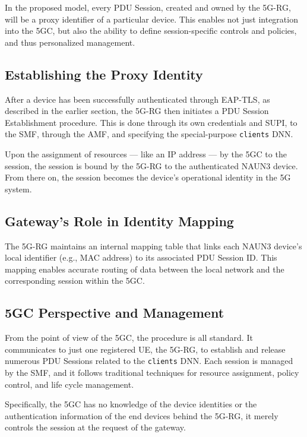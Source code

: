 In the proposed model, every \ac{PDU} Session, created and owned by the \ac{5G-RG}, will be a proxy identifier of a particular device. This enables not just integration into the \ac{5GC}, but also the ability to define session-specific controls and policies, and thus personalized management.

\subsection{Establishing the Proxy Identity}

After a device has been successfully authenticated through \ac{EAP-TLS}, as described in the earlier section, the \ac{5G-RG} then initiates a \ac{PDU} Session Establishment procedure. This is done through its own credentials and \ac{SUPI}, to the \ac{SMF}, through the \ac{AMF}, and specifying the special-purpose \texttt{clients} \ac{DNN}.

Upon the assignment of resources — like an IP address — by the \ac{5GC} to the session, the session is bound by the \ac{5G-RG} to the authenticated \ac{NAUN3} device. From there on, the session becomes the device’s operational identity in the \ac{5G} system.

\subsection{Gateway’s Role in Identity Mapping}

The \ac{5G-RG} maintains an internal mapping table that links each \ac{NAUN3} device’s local identifier (e.g., \ac{MAC} address) to its associated \ac{PDU} Session ID. This mapping enables accurate routing of data between the local network and the corresponding session within the \ac{5GC}.

\subsection{\ac{5GC} Perspective and Management}

From the point of view of the \ac{5GC}, the procedure is all standard. It communicates to just one registered \ac{UE}, the \ac{5G-RG}, to establish and release numerous \ac{PDU} Sessions related to the \texttt{clients} \ac{DNN}. Each session is managed by the \ac{SMF}, and it follows traditional techniques for resource assignment, policy control, and life cycle management.

Specifically, the \ac{5GC} has no knowledge of the device identities or the authentication information of the end devices behind the \ac{5G-RG}, it merely controls the session at the request of the gateway.


